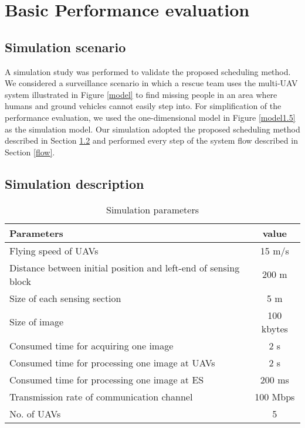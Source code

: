 \documentclass[journal]{IEEEtran}
\begin{document}
\section{Basic Performance evaluation}\label{eva}

\subsection{Simulation scenario}
A simulation study was performed to validate the proposed scheduling method.
%
We considered a surveillance scenario in which a rescue team uses the multi-UAV system illustrated in Figure \ref{model} to find missing people in an area where humans and ground vehicles cannot easily step into.
%
For simplification of the performance evaluation, we used the one-dimensional model in Figure \ref{model1.5} as the simulation model.
%
Our simulation adopted the proposed scheduling method described in Section \ref{} and performed every step of the system flow described in Section \ref{flow}.
%

\subsection{Simulation description}

\begin{table}[t]
\centering
\caption{Simulation parameters}
  \begin{tabular}{|p{5cm}||c|} \hline
Parameters & value \\ \hline
Flying speed of UAVs & 15 m/s \\ \hline
Distance between initial position and left-end of sensing block & 200 m  \\ \hline
Size of each sensing section & 5 m  \\ \hline
Size of image  &  100 kbytes \\ \hline
Consumed time for acquiring one image & 2 s \\ \hline
Consumed time for processing one image at UAVs &  2 s \\ \hline
Consumed time for processing one image at ES &  200 ms \\ \hline
Transmission rate of communication channel & 100 Mbps \\ \hline
No. of UAVs & 5\\ \hline
\end{tabular}
\label{para_val}
\end{table}
\end{document}
